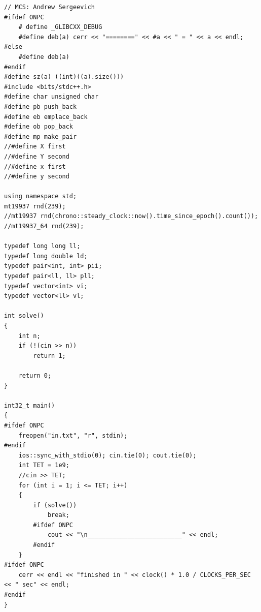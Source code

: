 \documentclass[10pt, portrait,letterpaper]{article}
\begin{document}
\begin{verbatim}
// MCS: Andrew Sergeevich
#ifdef ONPC
    # define _GLIBCXX_DEBUG
    #define deb(a) cerr << "========" << #a << " = " << a << endl;
#else
    #define deb(a)
#endif
#define sz(a) ((int)((a).size()))
#include <bits/stdc++.h>
#define char unsigned char
#define pb push_back
#define eb emplace_back
#define ob pop_back
#define mp make_pair
//#define X first
//#define Y second
//#define x first
//#define y second

using namespace std;
mt19937 rnd(239);
//mt19937 rnd(chrono::steady_clock::now().time_since_epoch().count());
//mt19937_64 rnd(239);

typedef long long ll;
typedef long double ld;
typedef pair<int, int> pii;
typedef pair<ll, ll> pll;
typedef vector<int> vi;
typedef vector<ll> vl;

int solve()
{
    int n;
    if (!(cin >> n))
        return 1;
    
    return 0;
}

int32_t main()
{
#ifdef ONPC
    freopen("in.txt", "r", stdin);
#endif
    ios::sync_with_stdio(0); cin.tie(0); cout.tie(0);
    int TET = 1e9;
    //cin >> TET;
    for (int i = 1; i <= TET; i++)
    {
        if (solve())
            break;
        #ifdef ONPC
            cout << "\n__________________________" << endl;
        #endif
    }
#ifdef ONPC
    cerr << endl << "finished in " << clock() * 1.0 / CLOCKS_PER_SEC << " sec" << endl;
#endif
}
\end{verbatim}
\end{document}
